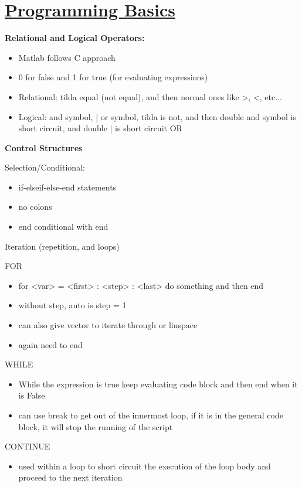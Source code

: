 \def \secname {Programming Basics}

\section[\secname]{\hyperlink{toc}{\secname}}


\textbf{Relational and Logical Operators:}

\begin{itemize}
    \item Matlab follows C approach
    \item 0 for false and 1 for true (for evaluating expressions)
    \item Relational: tilda equal (not equal), and then normal ones like >, <, etc...
    \item Logical: and symbol, | or symbol, tilda is not, and then double and symbol is short circuit, and double | is short circuit OR
\end{itemize}

\textbf{Control Structures}

Selection/Conditional:
\begin{itemize}
    \item  if-elseif-else-end statements
    \item no colons 
    \item end conditional with end
\end{itemize}

Iteration (repetition, and loops)

FOR
\begin{itemize}
    \item for <var> = <first> : <step> : <last> do something and then end
    \item without step, auto is step = 1
    \item can also give vector to iterate through or linspace
    \item again need to end
\end{itemize}

WHILE
\begin{itemize}
    \item While the expression is true keep evaluating code block and then end when it is False
    \item can use break to get out of the innermost loop, if it is in the general code block, it will stop the running of the script
\end{itemize}

CONTINUE
\begin{itemize}
    \item used within a loop to short circuit the execution of the loop body and proceed to the next iteration
\end{itemize}


